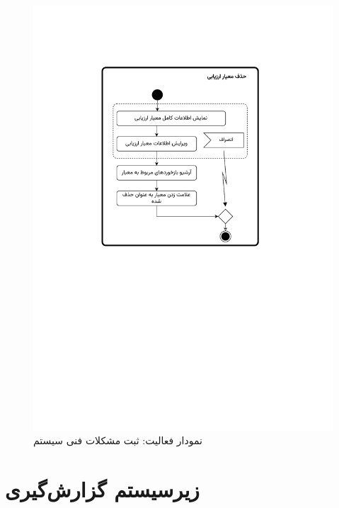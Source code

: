 \begin{figure}[ht!]
	\centering
	\includegraphics[scale=0.8, page=2]{figs/OOD-activity31-35.pdf}
	\caption{نمودار فعالیت: ثبت مشکلات فنی سیستم}
\end{figure}
\FloatBarrier
\newpage


\section{زیرسیستم گزارش‌گیری}


